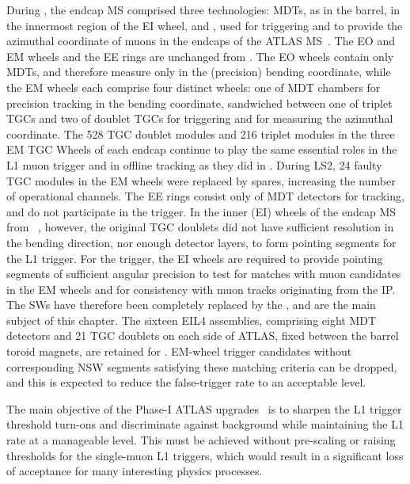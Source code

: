 \documentclass[cernpreprint, atlasdraft=false, UKenglish,british,orcidlogo, texmf, orcidlogo]{atlasdoc}
\begin{document}
During \RunOneTwo, the endcap \gls{MS} comprised three technologies: \glspl{MDT}, as in the barrel,  in the innermost region of the EI wheel, and , used for triggering and to provide the azimuthal coordinate of muons in the endcaps of the ATLAS \gls{MS}~\cite{PERF-2007-01}.
The EO and EM wheels and the EE rings are unchanged from \RunOne.
The EO wheels contain only \glspl{MDT}, and therefore measure only in the (precision) bending coordinate, while the EM wheels
each comprise four distinct wheels: one of \gls{MDT} chambers for precision tracking in the bending coordinate,
sandwiched between one of triplet \glspl{TGC} and two of doublet \glspl{TGC} for triggering and for measuring the azimuthal coordinate.
The \num{528} \gls{TGC} doublet modules and \num{216} triplet modules in the three EM \gls{TGC} Wheels
of each endcap continue to play the same essential roles in the \gls{L1} muon trigger and in offline tracking as they did in \RunOneTwo.
During \gls{LS2}, \num{24} 
faulty \gls{TGC} modules in the EM wheels were replaced by spares, increasing the number of operational channels.
The EE rings consist only of \gls{MDT} detectors for tracking, and do not participate in the trigger.
In the inner (EI) wheels of the endcap \gls{MS} from \RunOneTwo~\cite{PERF-2007-01}, however, the original \gls{TGC} doublets did not have sufficient resolution in the bending direction, nor enough detector layers, to form pointing segments for the \gls{L1} trigger.
For the \RunThr trigger, the EI wheels are required to provide pointing segments of sufficient angular precision to test for matches with muon candidates in the EM wheels and for consistency with muon tracks originating from the \gls{IP}.
The \glspl{SW} have therefore been completely replaced by the
, and are the main subject of this chapter.
The sixteen \gls{EIL4} assemblies, comprising eight \gls{MDT} detectors and \num{21} \gls{TGC} doublets on each side of ATLAS, fixed between the barrel toroid magnets, are retained for \RunThr.
EM-wheel trigger candidates without corresponding \gls{NSW} segments satisfying these matching criteria can be dropped, and this is expected to reduce the false-trigger rate to an acceptable level.
 
 
The main objective of the Phase-I ATLAS upgrades~\cite{ATLAS-Phase-I-LOI}
is to sharpen the \gls{L1} trigger threshold
turn-ons and discriminate against background
while maintaining
the \gls{L1} rate at a manageable level.
This must be achieved without pre-scaling or raising \pT thresholds for the single-muon \gls{L1} triggers, which would result in a significant loss of
acceptance for many interesting physics processes.
 
\end{document}
